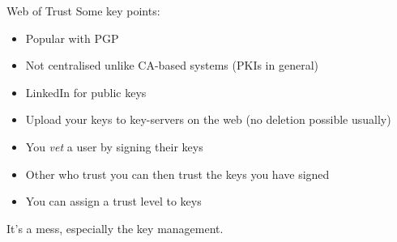 \begin{frame}{Web of Trust}
  Some key points:
  \begin{itemize}[<+(1)->]
    \item Popular with PGP
    \item Not centralised unlike CA-based systems (PKIs in general)
    \item LinkedIn for public keys
    \item Upload your keys to key-servers on the web (no deletion possible usually)
    \item You \emph{vet} a user by signing their keys
    \item Other who trust you can then trust the keys you have signed
    \item You can assign a trust level to keys
  \end{itemize}

  \pause
  It's a mess, especially the key management.
\end{frame}


